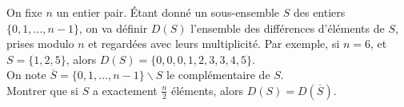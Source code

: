 On fixe $n$ un entier pair. Étant donné un sous-ensemble $S$ des entiers $\{0, 1, \dots, n - 1\}$, on va définir $D(S)$ l'ensemble des différences d'éléments de $S$, prises modulo $n$ et regardées avec leurs multiplicité. Par exemple, si $n = 6$, et $S = \{1, 2, 5\}$, alors $D(S) = \{0, 0, 0, 1, 2, 3, 3, 4, 5\}$.\\

On note $\overline S = \{0, 1, \dots, n - 1\} \backslash S$ le complémentaire de $S$. \\
Montrer que si $S$ a exactement $\frac n2$ éléments, alors $D(S) = D(\overline S)$.